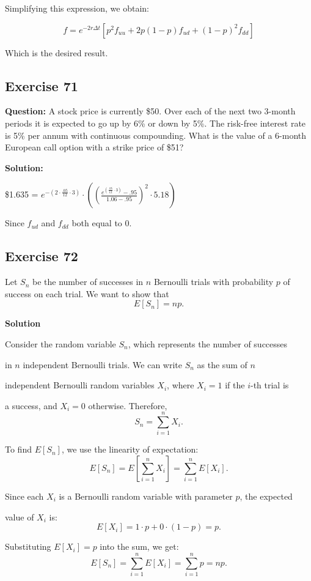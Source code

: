 \documentclass{article}
\begin{document}
Simplifying this expression, we obtain:

\[ f = e^{-2r \Delta t} [p^{2}f_{uu} + 2p(1 - p)f_{ud} + (1 - p)^{2}f_{dd}] \]

Which is the desired result.

\subsection*{Exercise 71}
\textbf{Question:} A stock price is currently \$50. Over each of the next two 3-month periods it is expected to go up by 6\% or down by 5\%. The risk-free interest rate is 5\% per annum with continuous compounding. What is the value of a 6-month European call option with a strike price of \$51?

\textbf{Solution:}

\$1.635 = $e^{-\left(2\cdot\frac{.05}{12}\cdot3\right)}\cdot\left(\left(\frac{e^{\left(\frac{.05}{12}\cdot3\right)}-.95}{1.06-.95}\right)^{2}\cdot5.18\right)$

Since $f_{ud}$ and $f_{dd}$ both equal to 0.

\subsection*{Exercise 72}

Let \( S_n \) be the number of successes in \( n \) Bernoulli trials with probability \( p \) of success on each trial. We want to show that
\[
E[S_n] = np.
\]

\textbf{Solution}

Consider the random variable \( S_n \), which represents the number of successes 

in \( n \) independent Bernoulli trials. We can write \( S_n \) as the sum of \( n \) 

independent Bernoulli random variables \( X_i \), where \( X_i = 1 \) if the \( i \)-th trial is 

a success, and \( X_i = 0 \) otherwise. Therefore,
\[
S_n = \sum_{i=1}^n X_i.
\]

To find \( E[S_n] \), we use the linearity of expectation:
\[
E[S_n] = E\left[ \sum_{i=1}^n X_i \right] = \sum_{i=1}^n E[X_i].
\]

Since each \( X_i \) is a Bernoulli random variable with parameter \( p \), the expected 

value of \( X_i \) is:
\[
E[X_i] = 1 \cdot p + 0 \cdot (1-p) = p.
\]

Substituting \( E[X_i] = p \) into the sum, we get:
\[
E[S_n] = \sum_{i=1}^n E[X_i] = \sum_{i=1}^n p = np.
\]
\end{document}
